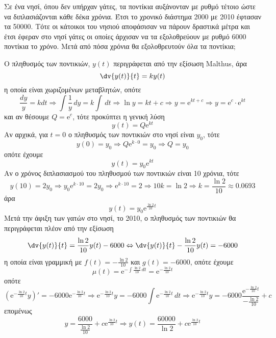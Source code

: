 \begin{problem}
  Σε ένα νησί, όπου δεν υπήρχαν γάτες, τα ποντίκια αυξάνονταν με ρυθμό τέτοιο ώστε 
  να διπλασιάζονται κάθε δέκα χρόνια. Έτσι το χρονικό διάστημα 2000 με 2010 έφτασαν τα
  50000. Τότε οι κάτοικοι του νησιού αποφάσισαν να πάρουν δραστικά μέτρα και έτσι 
  έφεραν στο νησί γάτες οι οποίες άρχισαν να τα εξολοθρεύουν με ρυθμό 6000 ποντίκια το 
  χρόνο. Μετά από πόσα χρόνια θα εξολοθρευτούν όλα τα ποντίκια;
\end{problem}
\begin{solution}
  Ο πληθυσμός των ποντικιών, $y(t)$ περιγράφεται από την εξίσωση Malthus, άρα 
  \[
    \dv{y(t)}{t} = k y(t) 
  \]
  η οποία είναι χωριζομένων μεταβλητών, οπότε
  \[
    \frac{dy}{y} = k dt \Rightarrow \int \frac{1}{y} \,{dy} = k \int \,{dt} \Rightarrow
    \ln{y} = k t + c \Rightarrow y = \mathrm{e}^{kt+c} \Rightarrow y = \mathrm{e}^{c} 
    \cdot \mathrm{e}^{kt}  
  \] 
  και αν θέσουμε $ Q = \mathrm{e}^{c} $, τότε προκύπτει η γενική λύση 
  \[
    y(t) = Q \mathrm{e}^{kt} 
  \]
  Αν αρχικά, για $ t=0 $ ο πληθυσμός των ποντικιών στο νησί είναι $ y_{0} $, τότε 
  \[
    y(0)= y_{0} \Rightarrow Q \mathrm{e}^{k \cdot 0} = y_{0} \Rightarrow Q = y_{0} 
  \] 
  οπότε έχουμε
  \[
    y(t) = y_{0} \mathrm{e}^{kt} 
  \] 
  Αν ο χρόνος διπλασιασμού του πληθυσμού των ποντικιών είναι 10 χρόνια, τότε
  \[
    y(10) = 2 y_{0} \Rightarrow y_{0} \mathrm{e}^{k \cdot 10} = 2 y_{0} \Rightarrow 
    \mathrm{e}^{k \cdot 10} = 2 \Rightarrow 10 k = \ln{2} \Rightarrow k 
    = \frac{\ln 2}{10} \approx 0.0693 
  \] 
  άρα 
  \[
    y(t) = y_{0} \mathrm{e}^{\frac{\ln{2}}{10} t}  
  \] 
  Μετά την άφιξη των γατών στο νησί, το 2010, ο πληθυσμός των ποντικιών θα 
  περιγράφεται πλέον από την εξίσωση 
  \[
    \dv{y(t)}{t} = \frac{\ln{2}}{10}y(t) - 6000 \Leftrightarrow \dv{y(t)}{t} -
    \frac{\ln{2}}{10}y(t) = -6000
  \] 
  η οποία είναι γραμμική με $ f(t) = - \frac{\ln{2}}{10} $ και $ g(t) = -6000 $, 
  οπότε έχουμε
  \[
    \mu (t) = \mathrm{e}^{- \int \frac{\ln{2}}{10} \,{dt}} = 
    \mathrm{e}^{- \frac{\ln{2}}{10} t} 
  \]
  οπότε
  \[
    \left( \mathrm{e}^{- \frac{\ln{2}}{10} t} y \right)' = 
    -6000 \mathrm{e}^{- \frac{\ln{2}}{10} t} \Rightarrow 
    \mathrm{e}^{- \frac{\ln{2}}{10} t} y = - 6000 \int \mathrm{e}^{- \frac{\ln{2}}{10}t}
    \,{dt} \Rightarrow \mathrm{e}^{- \frac{\ln{2}}{10} t} y = -6000
    \frac{\mathrm{e}^{-\frac{\ln{2}}{10} t} }{- \frac{\ln{2}}{10}} + c
  \] 
  επομένως
  \[
    y = \frac{6000}{\frac{\ln{2}}{10}} + c \mathrm{e}^{\frac{\ln{2}}{10} t} \Rightarrow 
    y(t) = \frac{60000}{\ln 2} + c \mathrm{e}^{\frac{\ln{2}}{10} t} 
  \] 


\end{solution}
